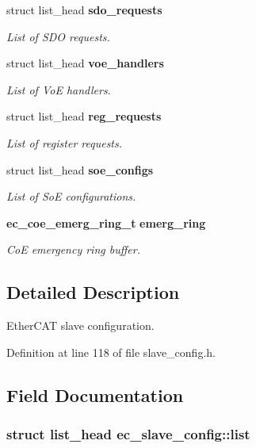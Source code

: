 \begin{DoxyCompactItemize}
struct list\-\_\-head {\bf sdo\-\_\-requests}
\begin{DoxyCompactList}\small\item\em List of S\-D\-O requests. \end{DoxyCompactList}\item 
struct list\-\_\-head {\bf voe\-\_\-handlers}
\begin{DoxyCompactList}\small\item\em List of Vo\-E handlers. \end{DoxyCompactList}\item 
struct list\-\_\-head {\bf reg\-\_\-requests}
\begin{DoxyCompactList}\small\item\em List of register requests. \end{DoxyCompactList}\item 
struct list\-\_\-head {\bf soe\-\_\-configs}
\begin{DoxyCompactList}\small\item\em List of So\-E configurations. \end{DoxyCompactList}\item 
{\bf ec\-\_\-coe\-\_\-emerg\-\_\-ring\-\_\-t} {\bf emerg\-\_\-ring}
\begin{DoxyCompactList}\small\item\em Co\-E emergency ring buffer. \end{DoxyCompactList}\end{DoxyCompactItemize}


\subsection{Detailed Description}
Ether\-C\-A\-T slave configuration. 

Definition at line 118 of file slave\-\_\-config.\-h.



\subsection{Field Documentation}
\subsubsection[{list}]{\setlength{\rightskip}{0pt plus 5cm}struct list\-\_\-head ec\-\_\-slave\-\_\-config\-::list}\label{structec__slave__config_a52b1f382ad8f4272ece7870347dc9118}


